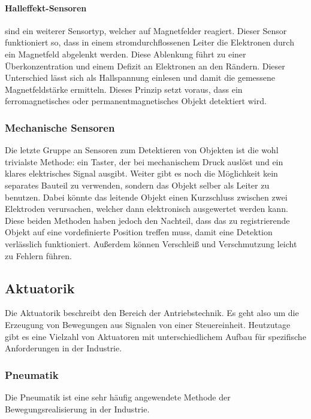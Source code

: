 \paragraph{Halleffekt-Sensoren} sind ein weiterer Sensortyp, welcher auf Magnetfelder reagiert. Dieser Sensor
funktioniert so, dass in einem stromdurchflossenen Leiter die Elektronen durch ein Magnetfeld abgelenkt werden.
Diese Ablenkung führt zu einer Überkonzentration und einem Defizit an Elektronen an den Rändern. Dieser Unterschied
lässt sich als Hallspannung einlesen und damit die gemessene Magnetfeldstärke ermitteln. Dieses Prinzip setzt
voraus, dass ein ferromagnetisches oder permanentmagnetisches Objekt detektiert wird.
%
%
\subsubsection{Mechanische Sensoren}
Die letzte Gruppe an Sensoren zum Detektieren von Objekten ist die wohl trivialste Methode: ein Taster, der
bei mechanischem Druck auslöst und ein klares elektrisches Signal ausgibt. Weiter gibt es noch die Möglichkeit
kein separates Bauteil zu verwenden, sondern das Objekt selber als Leiter zu benutzen. Dabei könnte
das leitende Objekt einen Kurzschluss zwischen zwei Elektroden verursachen, welcher dann elektronisch ausgewertet werden
kann. Diese beiden Methoden haben jedoch den Nachteil, dass das zu registrierende Objekt auf eine
vordefinierte Position treffen muss, damit eine Detektion verlässlich funktioniert. Außerdem können Verschleiß
und Verschmutzung leicht zu Fehlern führen.
%
%
\subsection{Aktuatorik}\label{sec:Aktorik}
Die Aktuatorik beschreibt den Bereich der Antriebstechnik. Es geht also um die Erzeugung von Bewegungen aus Signalen
von einer Steuereinheit. Heutzutage gibt es eine Vielzahl von Aktuatoren mit unterschiedlichem Aufbau für spezifische
Anforderungen in der Industrie.
%
\subsubsection{Pneumatik}
Die Pneumatik ist eine sehr häufig angewendete Methode der Bewegungsrealisierung in der Industrie.

